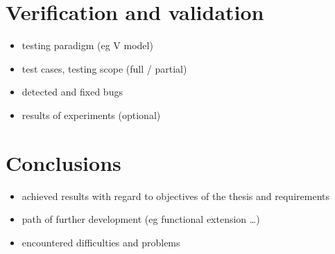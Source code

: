 \documentclass[a4paper,twoside,12pt]{book}
\begin{document}
\chapter{Verification and validation}
\begin{itemize}
\item testing paradigm (eg V model)
\item test cases, testing scope (full / partial)
\item detected and fixed bugs
\item results of experiments (optional)
\end{itemize}




\chapter{Conclusions}
\begin{itemize}
\item achieved results with regard to objectives of the thesis and requirements
\item path of further development (eg functional extension …)
\item encountered difficulties and problems
\end{itemize}
\end{document}
